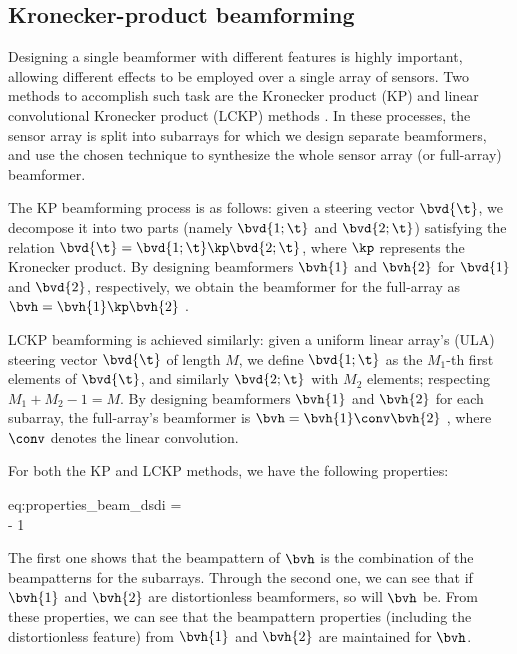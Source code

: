 \subsection{Kronecker-product beamforming}
\label{ssec:kp_beamformers}

Designing a single beamformer with different features is highly important, allowing different effects to be employed over a single array of sensors. Two methods to accomplish such task are the Kronecker product (KP) \cite{abramovich_iterative_2010,werner_estimation_2008} and linear convolutional Kronecker product (LCKP) methods \cite{frank_constant-beamwidth_2022-1}. In these processes, the sensor array is split into subarrays for which we design separate beamformers, and use the chosen technique to synthesize the whole sensor array (or full-array) beamformer.

% 
The KP beamforming process is as follows: given a steering vector $\bvd{\t}$, we decompose it into two parts (namely $\bvd{1;\t}$ and $\bvd{2;\t}$) satisfying the relation $\bvd{\t}= \bvd{1;\t} \kp \bvd{2;\t}$, where $\kp$ represents the Kronecker product. By designing beamformers $\bvh{1}$ and $\bvh{2}$ for $\bvd{1}$ and $\bvd{2}$, respectively, we obtain the beamformer for the full-array as $\bvh = \bvh{1} \kp \bvh{2}$ \cite{huang_robust_2020}.

% 
LCKP beamforming is achieved similarly: given a uniform linear array's (ULA) steering vector $\bvd{\t}$ of length $M$, we define $\bvd{1;\t}$ as the $M_1$-th first elements of $\bvd{\t}$, and similarly $\bvd{2;\t}$ with $M_2$ elements; respecting $M_1 + M_2 - 1 = M$. By designing beamformers $\bvh{1}$ and $\bvh{2}$ for each subarray, the full-array's beamformer is $\bvh = \bvh{1} \conv \bvh{2}$ \cite{frank_constant-beamwidth_2022-1}, where $\conv$ denotes the linear convolution.

% 
For both the KP and LCKP methods, we have  the following properties:
\begin{subgather}{eq:properties_beam_dsdi}
	\label{eq:separation_beampattern}%
    \beam{\bvh,\bvd{\t}} =   \eqc \\
	\label{eq:ineq_separation_dsdi}%
    \dsdi{\bvh,\bvd} \leq {}  - 1 \eqp
\end{subgather}
The first one shows that the beampattern of $\bvh$ is the combination of the beampatterns for the subarrays. Through the second one, we can see that if $\bvh{1}$ and $\bvh{2}$ are distortionless beamformers, so will $\bvh$ be. From these properties, we can see that the beampattern properties (including the distortionless feature) from $\bvh{1}$ and $\bvh{2}$ are maintained for $\bvh$.